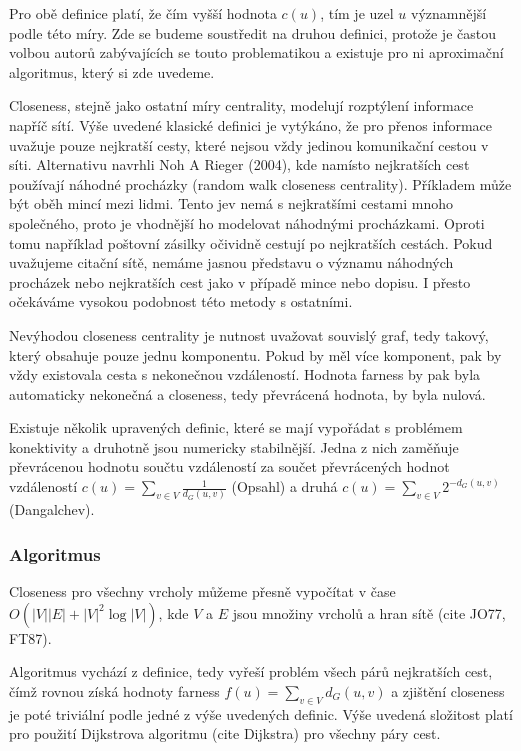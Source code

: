\documentclass[12pt,titlepage]{report}
\begin{document}
Pro obě definice platí, že čím vyšší hodnota $c(u)$, tím je uzel $u$
významnější podle této míry. Zde se budeme soustředit na druhou definici,
protože je častou volbou autorů zabývajících se touto problematikou a existuje
pro ni aproximační algoritmus, který si zde uvedeme.

Closeness, stejně jako ostatní míry centrality, modelují rozptýlení informace
napříč sítí. Výše uvedené klasické definici je vytýkáno, že pro přenos
informace uvažuje pouze nejkratší cesty, které nejsou vždy jedinou komunikační
cestou v síti. Alternativu navrhli Noh A Rieger (2004), kde namísto nejkratších
cest používají náhodné procházky (random walk closeness centrality). Příkladem
může být oběh mincí mezi lidmi. Tento jev nemá s nejkratšími cestami mnoho
společného, proto je vhodnější ho modelovat náhodnými procházkami. Oproti tomu
například poštovní zásilky očividně cestují po nejkratších cestách.  Pokud
uvažujeme citační sítě, nemáme jasnou představu o významu náhodných procházek
nebo nejkratších cest jako v případě mince nebo dopisu. I přesto očekáváme
vysokou podobnost této metody s ostatními.

Nevýhodou closeness centrality je nutnost uvažovat souvislý graf, tedy takový,
který obsahuje pouze jednu komponentu. Pokud by měl více komponent, pak by vždy
existovala cesta s nekonečnou vzdáleností. Hodnota farness by pak byla
automaticky nekonečná a closeness, tedy převrácená hodnota, by byla nulová.

Existuje několik upravených definic, které se mají vypořádat s problémem
konektivity a druhotně jsou numericky stabilnější. Jedna z nich zaměňuje
převrácenou hodnotu součtu vzdáleností za součet převrácených hodnot
vzdáleností $c(u) = \sum_{v \in V} \frac{1}{d_G(u, v)}$ (Opsahl) a druhá 
$c(u) = \sum_{v \in V} 2^{-d_G(u, v)}$ (Dangalchev).



\subsubsection{Algoritmus}
Closeness pro všechny vrcholy můžeme přesně vypočítat v čase $O(|V||E| +
|V|^2\log|V|)$, kde $V$ a $E$ jsou množiny vrcholů a hran sítě (cite JO77,
FT87). 

Algoritmus vychází z definice, tedy vyřeší problém všech párů nejkratších cest,
čímž rovnou získá hodnoty farness $f(u) = \sum_{v \in V} d_G(u, v)$ a zjištění
closeness je poté triviální podle jedné z výše uvedených definic.  Výše uvedená
složitost platí pro použití Dijkstrova algoritmu (cite Dijkstra) pro všechny
páry cest.
\end{document}
